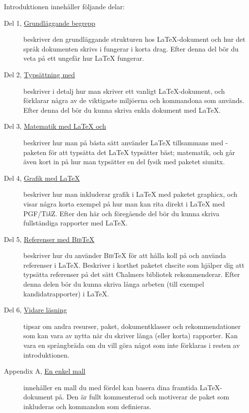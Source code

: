 \documentclass[swe,12pt]{skrapport}
\makeatletter
\let\@oldLaTeX\LaTeX
\def\LaTeX{\texorpdfstring{\@oldLaTeX}{LaTeX}}
\let\@oldAmS\AmS
\def\AmS{\texorpdfstring{\@oldAmS}{AMS}}
\newcommand\pack[1]{\textsf{#1}}						%
\newcommand\pdfLaTeX{\hologo{pdfLaTeX}}					%
\newcommand\BibTeX{\textsc{Bib}\TeX}					%
\newcommand\PGFTikZ{PGF/Ti\emph{k}Z}					%
\makeatother
\begin{document}
	Introduktionen innehåller följande delar:
	\begin{description}
		\item[{Del 1, \hyperref[sec:1]{Grundläggande begrepp}}]
		beskriver den grundläggande strukturen hos \LaTeX-dokument och hur det
		språk dokumenten skrivs i fungerar i korta drag. Efter denna del bör
		du veta på ett ungefär hur \LaTeX{} fungerar.
		
		\item[{Del 2, \hyperref[sec:2]{Typsättning med \pdfLaTeX}}]
		beskriver i detalj hur man skriver ett vanligt
		\LaTeX-dokument, och förklarar några av de viktigaste miljöerna
		och kommandona som används. Efter denna del bör du kunna skriva enkla
		dokument med \LaTeX.
		
		\item[{Del 3, \hyperref[sec:3]{Matematik med \LaTeX{} och \AmS}}]
		beskriver hur man på bästa sätt använder \LaTeX{} tillsammans med
		\AmS-paketen för att typsätta det \LaTeX{} typsätter bäst; matematik,
		och går även kort in på hur man typsätter en del fysik med paketet
		\pack{siunitx}.
		
		\item[{Del 4, \hyperref[sec:4]{Grafik med \LaTeX}}]
		beskriver hur man inkluderar grafik i \LaTeX{} med paketet
		\pack{graphicx}, och visar några korta exempel på hur man kan rita
		direkt i \LaTeX{} med \PGFTikZ{}. Efter den här och föregående del bör
		du kunna skriva fullständiga rapporter med \LaTeX.
		
		\item[{Del 5, \hyperref[sec:5]{Referenser med \BibTeX}}]
		beskriver hur du använder \BibTeX{} för att hålla koll på och använda
		referenser i \LaTeX. Beskriver i korthet paketet \pack{chscite} som
		hjälper dig att typsätta referenser på det sätt Chalmers bibliotek
		rekommenderar. Efter denna delen bör du kunna skriva långa arbeten
		(till exempel kandidatrapporter) i \LaTeX.
		
		\item[{Del 6, \hyperref[sec:6]{Vidare läsning}}]
		tipsar om andra resurser, paket, dokumentklasser och rekommendationer
		som kan vara av nytta när du skriver långa (eller korta) rapporter.
		Kan vara en språngbräda om du vill göra något som inte förklaras i
		resten av introduktionen.
		
		\item[Appendix A, {\hyperref[app:1]{En enkel mall}}]
		innehåller en mall du med fördel kan basera dina framtida 
		\LaTeX{}-dokument
		på. Den är fullt kommenterad och motiverar de paket som inkluderas och
		kommandon som definieras.
	\end{description}
	
\end{document}
